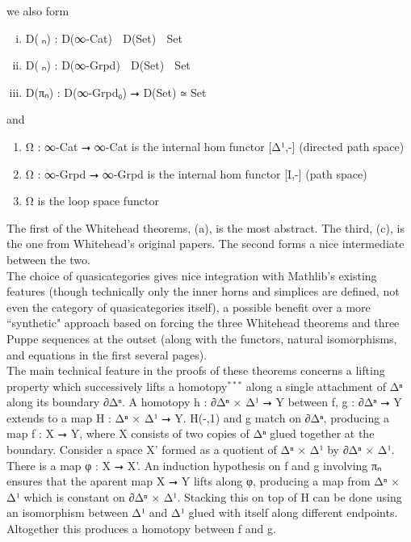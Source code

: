 \documentclass{book}
\theoremstyle{definition}
\begin{document}
we also form

\begin{enumerate}[(i)]
\item D⃗(π⃗ₙ) : D⃗(∞-Cat) ⭢ D⃗(Set) ≃ Set
\item D⃡(π⃡ₙ) : D⃡(∞-Grpd) ⭢ D⃡(Set) ≃ Set
\item D(πₙ) : D(∞-Grpd₀) ⭢ D(Set) ≃ Set
\end{enumerate}

and

\begin{enumerate}
\item Ω⃗ : ∞-Cat ⭢ ∞-Cat is the internal hom functor [Δ¹,-] (directed path space)
\item Ω⃡ : ∞-Grpd ⭢ ∞-Grpd is the internal hom functor [I,-] (path space)
\item Ω is the loop space functor
\end{enumerate}

The first of the Whitehead theorems, (a), is the most abstract. The third, (c), is the one from Whitehead's original papers. The second forms a nice intermediate between the two.\\



The choice of quasicategories gives nice integration with Mathlib's existing features (though technically only the inner horns and simplices are defined, not even the category of quasicategories itself), a possible benefit over a more ``synthetic" approach based on forcing the three Whitehead theorems and three Puppe sequences at the outset (along with the functors, natural isomorphisms, and equations in the first several pages). \\

The main technical feature in the proofs of these theorems concerns a lifting property which successively lifts a homotopy${}^{***}$ along a single attachment of Δⁿ along its boundary ∂Δⁿ. A homotopy h : ∂Δⁿ × Δ¹ ⭢ Y between f, g : ∂Δⁿ ⭢ Y extends to a map H : Δⁿ × Δ¹ ⭢ Y. H(-,1) and g match on ∂Δⁿ, producing a map f : X ⭢ Y, where X consists of two copies of Δⁿ glued together at the boundary. Consider a space X' formed as a quotient of Δⁿ × Δ¹ by ∂Δⁿ × Δ¹. There is a map φ : X ⭢ X'. An induction hypothesis on f and g involving πₙ ensures that the aparent map X ⭢ Y lifts along φ, producing a map from Δⁿ × Δ¹ which is constant on ∂Δⁿ × Δ¹. Stacking this on top of H can be done using an isomorphism between Δ¹ and Δ¹ glued with itself along different endpoints. Altogether this produces a homotopy between f and g.\\
\end{document}
